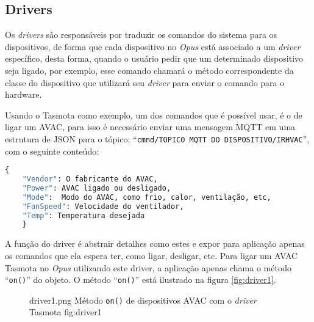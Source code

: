 \subsection{Drivers}

Os \emph{drivers} são responsáveis por traduzir os comandos do sistema para os dispositivos, de forma que cada dispositivo no \emph{Opus} está
associado a um \emph{driver} específico, desta forma, quando o usuário pedir que um determinado dispositivo seja ligado, por exemplo,
esse comando chamará o método correspondente da classe do dispositivo que utilizará seu \emph{driver} para enviar o comando para o hardware.

Usando o Tasmota como exemplo, um dos comandos que é possível usar, é o de ligar um AVAC, para isso é necessário enviar uma mensagem
MQTT em uma estrutura de JSON para o tópico: ``\lstinline{cmnd/TOPICO MQTT DO DISPOSITIVO/IRHVAC}'', com o seguinte conteúdo:
\begin{lstlisting}[language=Python]
    {
    "Vendor": O fabricante do AVAC,
    "Power": AVAC ligado ou desligado,
    "Mode":  Modo do AVAC, como frio, calor, ventilação, etc,
    "FanSpeed": Velocidade do ventilador,
    "Temp": Temperatura desejada
    }
\end{lstlisting}

A função do driver é abstrair detalhes como estes e expor para aplicação apenas os comandos que ela espera ter, como ligar, desligar, etc.
Para ligar um AVAC Tasmota no \emph{Opus} utilizando este driver, a aplicação apenas chama o método ``\lstinline{on()}'' do objeto. O
método ``\lstinline{on()}'' está ilustrado na figura \ref{fig:driver1}.
\begin{figure}[h!]
    {driver1.png}
    {Método \lstinline{on()} de dispositivos AVAC com o \emph{driver} Tasmota}
    {fig:driver1}
\end{figure}

